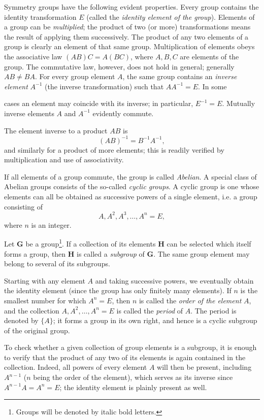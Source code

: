 Symmetry groups have the following evident properties. Every group contains the identity transformation $E$ (called the \emph{identity element of the group}). Elements of a group can be \emph{multiplied}; the product of two (or more) transformations means the result of applying them successively. The product of any two elements of a group is clearly an element of that same group. Multiplication of elements obeys the associative law $(AB)C=A(BC)$, where $A,B,C$ are elements of the group. The commutative law, however, does not hold in general; generally $AB\ne BA$. For every group element $A$, the same group contains an \emph{inverse element} $A^{-1}$ (the inverse transformation) such that $AA^{-1}=E$. In some

cases an element may coincide with its inverse; in particular, $E^{-1}=E$. Mutually inverse elements $A$ and $A^{-1}$ evidently commute.

The element inverse to a product $AB$ is
\[
(AB)^{-1}=B^{-1}A^{-1},
\]
and similarly for a product of more elements; this is readily verified by multiplication and use of associativity.

If all elements of a group commute, the group is called \emph{Abelian}. A special class of Abelian groups consists of the so-called \emph{cyclic groups}. A cyclic group is one whose elements can all be obtained as successive powers of a single element, i.e. a group consisting of
\[
A,A^2,A^3,\ldots,A^n=E,
\]
where $n$ is an integer.

Let $\boldsymbol{G}$ be a group\footnote{Groups will be denoted by italic bold letters.}. If a collection of its elements $\boldsymbol{H}$ can be selected which itself forms a group, then $\boldsymbol{H}$ is called a \emph{subgroup} of $\boldsymbol{G}$. The same group element may belong to several of its subgroups.

Starting with any element $A$ and taking successive powers, we eventually obtain the identity element (since the group has only finitely many elements). If $n$ is the smallest number for which $A^n=E$, then $n$ is called the \emph{order of the element} $A$, and the collection $A,A^2,\ldots,A^n=E$ is called the \emph{period} of $A$. The period is denoted by $\{A\}$; it forms a group in its own right, and hence is a cyclic subgroup of the original group.

To check whether a given collection of group elements is a subgroup, it is enough to verify that the product of any two of its elements is again contained in the collection. Indeed, all powers of every element $A$ will then be present, including $A^{n-1}$ ($n$ being the order of the element), which serves as its inverse since $A^{n-1}A=A^n=E$; the identity element is plainly present as well.

